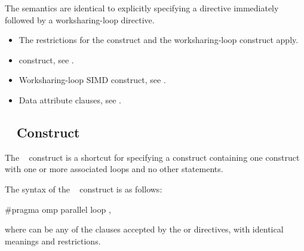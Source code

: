 \descr
The semantics are identical to explicitly specifying a  directive 
immediately followed by a worksharing-loop directive.

\restrictions
\begin{itemize}
\item The restrictions for the  construct and the
    worksharing-loop construct apply.
\end{itemize}

\crossreferences
\begin{itemize}
\item {} construct, see
.

\item Worksharing-loop SIMD construct, see
.

\item Data attribute clauses, see
.
\end{itemize}



\subsection{~ Construct}
\label{subsec:parallel loop Construct}
\summary
The ~ construct is a shortcut for specifying a 
 construct containing one  construct with one or 
more associated loops and no other statements.

\syntax
\begin{ccppspecific}
The syntax of the ~ construct is as follows:

\begin{ompcPragma}
#pragma omp parallel loop \plc{[clause[ [},\plc{] clause] ... ] new-line}
\end{ompcPragma}

where  can be any of the clauses accepted by the  or
 directives, with identical meanings and restrictions.
\end{ccppspecific}

